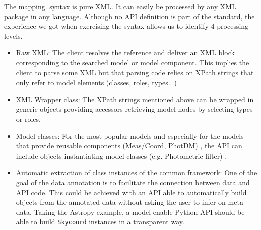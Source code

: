 The mapping. syntax is pure XML. It can easily be processed by any XML package in any language.
Although no API definition is part of the standard, the experience we got when exercising the syntax allows us to identify 
4 processing levels.


\begin{itemize} 
  \item Raw XML: The client resolves the reference and deliver an XML block corresponding to the searched model or model component. 
          This implies the client to parse some XML but that parsing code relies on XPath strings that only refer to model elements (classes, roles, types...)
  \item XML Wrapper class: The XPath strings mentioned above can be wrapped in generic objects providing accessors retrieving model nodes by selecting types or roles. 
  \item Model classes: For the most popular models and especially for the models that provide reusable components (Meas/Coord, PhotDM) , the API can include objects instantiating model classes (e.g. Photometric filter) .
  \item Automatic extraction of class instances of the common framework: One of the goal of the data annotation is to facilitate the connection between data and API code. This could be achieved with an API able to automatically build objects from the annotated data without asking the user to infer on meta data. Taking the Astropy example, a model-enable Python API should be able to build \texttt{Skycoord} instances in a transparent way.
 \end{itemize}

